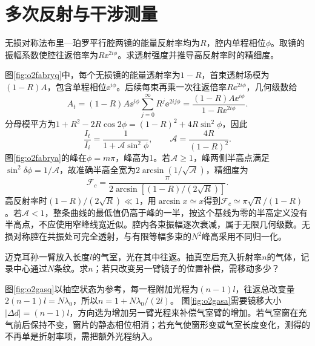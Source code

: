 \section{多次反射与干涉测量}
\begin{example}\label{ex:o2fabry}
无损对称法布里—珀罗平行腔两镜的能量反射率均为$R$，腔内单程相位$\phi$。取镜的振幅系数使腔往返倍率为$R\ee^{2i\phi}$。求透射强度并推导高反射率时的精细度。
\end{example}
\begin{solution}
图\ref{fig:o2fabryq}中，每个无损镜的能量透射率为$1-R$，首束透射场模为$(1-R)A$，包含单程相位$\ee^{i\phi}$。后续每束再乘一次往返倍率$R\ee^{2i\phi}$，几何级数给
\[
 A_t=(1-R)A\ee^{i\phi}\sum_{j=0}^\infty R^j\ee^{2ij\phi}
 =\frac{(1-R)A\ee^{i\phi}}{1-R\ee^{2i\phi}}.
\]
分母模平方为$1+R^2-2R\cos2\phi=(1-R)^2+4R\sin^2\phi$，因此
\[
 \frac{I_t}{I_i}=\frac1{1+\mathcal A\sin^2\phi},\qquad
 \mathcal A=\frac{4R}{(1-R)^2}.
\]
图\ref{fig:o2fabrya}的峰在$\phi=m\pi$，峰高为1。若$\mathcal A\geq1$，峰两侧半高点满足$\sin^2\delta\phi=1/\mathcal A$，故准确半高全宽为$2\arcsin(1/\sqrt{\mathcal A})$，精细度为
\[
 \mathcal F_c=\frac{\pi}{2\arcsin[(1-R)/(2\sqrt R)]}.
\]
高反射率时$(1-R)/(2\sqrt R)\ll1$，用$\arcsin x\simeq x$得到$\mathcal F_c\simeq\pi\sqrt R/(1-R)$。若$\mathcal A<1$，整条曲线的最低值仍高于峰的一半，按这个基线为零的半高定义没有半高点，不应使用窄峰线宽近似。腔内各束振幅逐次衰减，属于无限几何级数。无损对称腔在共振处可完全透射，与有限等幅多束的$N^2$峰高采用不同归一化。
\end{solution}

\begin{example}\label{ex:o2gascell}
迈克耳孙一臂放入长度$l$的气室，光在其中往返。抽真空后充入折射率$n$的气体，记录中心通过$N$条纹。求$n$；若只改变另一臂镜子的位置补偿，需移动多少？
\end{example}
\begin{solution}
图\ref{fig:o2gasq}以抽空状态为参考，每一程附加光程为$(n-1)l$，往返总改变量$2(n-1)l=N\lambda_0$，所以$n=1+N\lambda_0/(2l)$。
图\ref{fig:o2gasa}需要镜移大小$|\Delta d|=(n-1)l$，方向选为增加另一臂光程来补偿气室臂的增加。若气室窗在充气前后保持不变，窗片的静态相位相消；若充气使窗形变或气室长度变化，测得的不再单是折射率项，需把额外光程纳入。
\end{solution}

